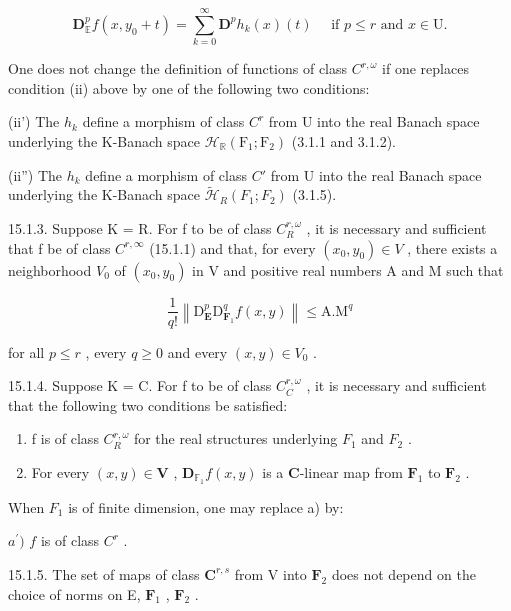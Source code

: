 \[
\mathbf {D} _ {\mathbb {E}} ^ {p} f (x, y _ {0} + t) = \sum_ {k = 0} ^ {\infty} \mathbf {D} ^ {p} h _ {k} (x) (t) \quad \text { if } p \leqslant r \text { and } x \in \mathrm{U}.\tag{2}
\]

One does not change the definition of functions of class \(C^{r,\omega}\) if one replaces condition (ii) above by one of the following two conditions:

(ii') The \(h_k\) define a morphism of class \(C^r\) from U into the real Banach space underlying the K-Banach space \(\mathcal{H}_{\mathbb{R}}(\mathrm{F}_1; \mathrm{F}_2)\) (3.1.1 and 3.1.2).

(ii'') The \(h_k\) define a morphism of class \(C'\) from U into the real Banach space underlying the K-Banach space \(\tilde{\mathcal{H}}_R(F_1; F_2)\) (3.1.5).

15.1.3. Suppose K = R. For f to be of class \(C_{R}^{r,\omega}\) , it is necessary and sufficient that f be of class \(C^{r,\infty}\) (15.1.1) and that, for every \((x_{0}, y_{0}) \in V\) , there exists a neighborhood \(V_{0}\) of \((x_{0}, y_{0})\) in V and positive real numbers A and M such that

\[
\frac {1}{q !} \left\| \mathrm{D} _ {\mathbf {E}} ^ {p} \mathrm{D} _ {\mathbf {F} _ {1}} ^ {q} f (x, y) \right\| \leqslant \mathrm{A}. \mathrm{M} ^ {q}\tag{3}
\]

for all \(p \leqslant r\) , every \(q \geqslant 0\) and every \((x, y) \in V_0\) .

15.1.4. Suppose K = C. For f to be of class \(C_{C}^{r,\omega}\) , it is necessary and sufficient that the following two conditions be satisfied:

\begin{enumerate}
\def\labelenumi{\alph{enumi})}
\item
  f is of class \(C_{R}^{r,\omega}\) for the real structures underlying \(F_{1}\) and \(F_{2}\) .
\item
  For every \((x, y) \in \mathbf{V}\) , \(\mathbf{D}_{\mathbb{F}_1} f(x, y)\) is a \(\mathbf{C}\)-linear map from \(\mathbf{F}_1\) to \(\mathbf{F}_2\) .
\end{enumerate}

When \(F_{1}\) is of finite dimension, one may replace a) by:

\(\mathit{a}^{\prime})\) \(f\) is of class \(C^{r}\) .

15.1.5. The set of maps of class \(\mathbf{C}^{r,s}\) from V into \(\mathbf{F}_2\) does not depend on the choice of norms on E, \(\mathbf{F}_1\) , \(\mathbf{F}_2\) .

